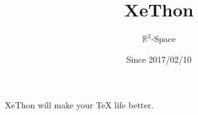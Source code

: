 \documentclass{jarticle}
\begin{document}
\title{XeThon}
\author{$\mathbb{R}^2$-Space}
\date{Since 2017/02/10}
\maketitle

XeThon will make your TeX life better.
\end{document}
